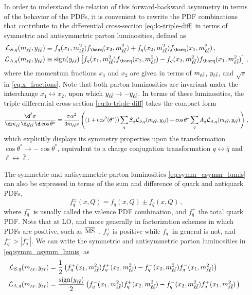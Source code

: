 In order to understand the relation of this forward-backward
asymmetry in terms of the
behavior of the PDFs, it is convenient
to rewrite the PDF combinations that contribute to the differential
cross-section \cref{eq:lo-triple-diff} in terms of symmetric and
antisymmetric parton luminosities, defined as
\begin{align}
  \mathcal{L}_{S,q}(\mll, \yll) &\equiv f_q(x_1,\mll^2) f_{\barq}(x_2,\mll^2) + f_q(x_2,\mll^2) f_{\barq}(x_1,\mll^2) \, ,
  \nonumber\\
  \mathcal{L}_{A,q}(\mll, \yll) &\equiv \sign (\yll) \left[ f_q(x_1,\mll^2) f_{\barq}(x_2,\mll^2) - f_q(x_2,\mll^2) f_{\barq}(x_1,\mll^2)\right] \, , \label{eq:symm_asymm_lumis}
\end{align}
where the momentum fractions $x_1$ and $x_2$ are given in terms of $m_{\ell\bar{\ell}}$, $y_{\ell\bar{\ell}}$,
and $\sqrt{s}$ in \cref{eq:x_fractions}.
Note that both parton luminosities are invariant under
the interchange $x_1\leftrightarrow x_2$, upon which $y_{\ell\bar{\ell}} \to -y_{\ell\bar{\ell}}$.
%
In terms of these luminosities, the triple differential cross-section \cref{eq:lo-triple-diff}
takes the compact form
\begin{equation}
  \label{eq:lo-triple-diff-lumis}
  \frac{\d^3 \sigma}{\d \mll \, \d \yll \, \d\cos\theta^*} =
  \frac{\pi \alpha^2}{3 \mll s} \left( (1+\cos^2({\theta^*})) \sum_q S_q \mathcal{L}_{S,q}(\mll, \yll)
  + \cos\theta^* \sum_q A_q \mathcal{L}_{A,q}(\mll, \yll)  \right) \, ,
\end{equation}
which explicitly displays
its symmetry properties upon the transformation $\cos\theta^* \to -\cos\theta^*$,
equivalent to a charge conjugation transformation 
$q\leftrightarrow \bar q$ and $\ell \leftrightarrow \bar{\ell} $.

The symmetric and antisymmetric parton luminosities \cref{eq:symm_asymm_lumis} can also be expressed
in terms of the sum and difference of quark and antiquark PDFs,
\begin{equation}
  \label{eq:fqpm}
  f_{q}^\pm \left( x, Q\right) = f_{q} \left( x, Q\right) \pm f_{\bar{q}} \left( x, Q\right) \, ,
\end{equation}
where $f_{q}^-$ is usually called the valence PDF combination,
and $f_{q}^+$  the total quark PDF\@. Note that at LO, and more
generally in factorization schemes in which PDFs are
positive, such as $\overline{\rm MS}$~\cite{Candido:2020yat}, $f^+_q$
is positive while $f_q^-$
in general is not, and $f_{q}^+>|f_{q}^-|$.
%
We can write the symmetric and antisymmetric parton luminosities in
\cref{eq:symm_asymm_lumis} as
\begin{align}
  \mathcal{L}_{S,q}(m_{\ell\bar{\ell}}, y_{\ell\bar{\ell}}) &= \frac {1} 2 \left( f_q^+(x_1,m_{\ell\bar{\ell}}^2) f_{q}^+(x_2,m_{\ell\bar{\ell}}^2) - f_q^-(x_2,m_{\ell\bar{\ell}}^2) f_{q}^-(x_1,m_{\ell\bar{\ell}}^2)  \right) \, \label{eq:lumiss_qpm}\\
  \mathcal{L}_{A,q}(m_{\ell\bar{\ell}}, y_{\ell\bar{\ell}}) &= \frac {\operatorname{sign} (y_{\ell\bar{\ell}})} 2 \left( f_q^-(x_1,m_{\ell\bar{\ell}}^2) f_{q}^+(x_2,m_{\ell\bar{\ell}}^2) - f_q^-(x_2,m_{\ell\bar{\ell}}^2) f_{q}^+(x_1,m_{\ell\bar{\ell}}^2)  \, \right) \,. \label{eq:lumisa_qpm}
\end{align}

